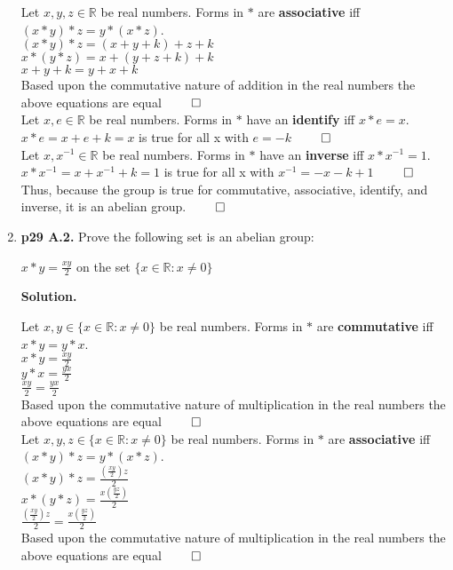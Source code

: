 \documentclass[11pt]{article}
\begin{document}
\begin{enumerate}
  Let $x, y, z \in \mathbb{R}$ be real numbers. Forms in $*$ are {\bfseries associative} iff $(x*y)*z = y*(x*z)$. \\
  $(x*y)*z = (x + y + k) + z + k$ \\
  $x*(y*z) = x + (y + z +k) + k$ \\
  $x + y + k = y + x + k$ \\
  Based upon the commutative nature of addition in the real numbers the above equations are equal $\qed$\\
   
  Let $x,e \in \mathbb{R}$ be real numbers. Forms in $*$ have an {\bfseries identify} iff $x*e = x$. \\
  $x*e = x + e + k = x$ is true for all x with $e = -k$ $\qed$\\
  
  Let $x,x^{-1} \in \mathbb{R}$ be real numbers. Forms in $*$ have an {\bfseries inverse} iff $x*x^{-1} = 1$. \\
  $x*x^{-1} = x + x^{-1} + k = 1$ is true for all x with $x^{-1} = -x-k+1$ $\qed$\\
  
  Thus, because the group is true for commutative, associative, identify, and inverse, it is an abelian group. $\qed$\\
 
\item {\bfseries p29 A.2.}
  Prove the following set is an abelian group:
  
  $x*y = \frac{xy}{2}$ on the set $\{x \in \mathbb{R} : x \neq 0\}$
  
  {\bfseries Solution.}
  
  Let $x, y \in \{x \in \mathbb{R} : x \neq 0\}$ be real numbers. Forms in $*$ are {\bfseries commutative} iff $x*y = y*x$. \\
  $x*y = \frac{xy}{2}$ \\
  $y*x = \frac{yx}{2}$ \\
  $\frac{xy}{2} = \frac{yx}{2}$ \\
  Based upon the commutative nature of multiplication in the real numbers the above equations are equal $\qed$\\
  
  Let $x, y, z \in \{x \in \mathbb{R} : x \neq 0\}$ be real numbers. Forms in $*$ are {\bfseries associative} iff $(x*y)*z = y*(x*z)$. \\
  $(x*y)*z = \frac{(\frac{xy}{2})z}{2}$ \\
  $x*(y*z) = \frac{x(\frac{yz}{2})}{2}$ \\
  $\frac{(\frac{xy}{2})z}{2} = \frac{x(\frac{yz}{2})}{2}$ \\
  Based upon the commutative nature of multiplication in the real numbers the above equations are equal $\qed$\\
   

\end{enumerate}
\end{document}
